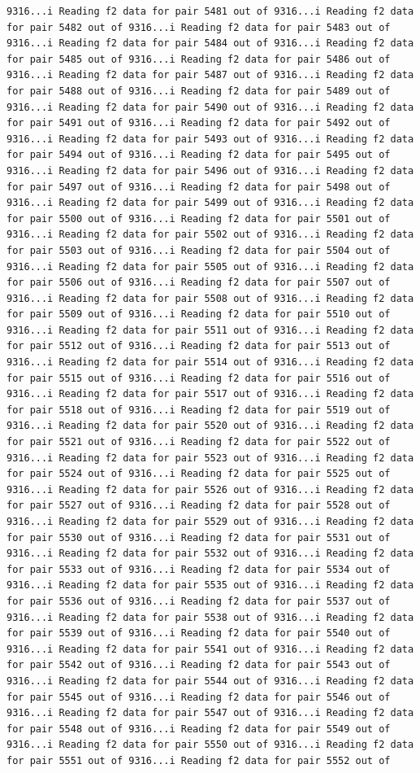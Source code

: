 \documentclass[
]{article}
\begin{document}
\begin{verbatim}
9316...i Reading f2 data for pair 5481 out of 9316...i Reading f2 data for pair 5482 out of 9316...i Reading f2 data for pair 5483 out of 9316...i Reading f2 data for pair 5484 out of 9316...i Reading f2 data for pair 5485 out of 9316...i Reading f2 data for pair 5486 out of 9316...i Reading f2 data for pair 5487 out of 9316...i Reading f2 data for pair 5488 out of 9316...i Reading f2 data for pair 5489 out of 9316...i Reading f2 data for pair 5490 out of 9316...i Reading f2 data for pair 5491 out of 9316...i Reading f2 data for pair 5492 out of 9316...i Reading f2 data for pair 5493 out of 9316...i Reading f2 data for pair 5494 out of 9316...i Reading f2 data for pair 5495 out of 9316...i Reading f2 data for pair 5496 out of 9316...i Reading f2 data for pair 5497 out of 9316...i Reading f2 data for pair 5498 out of 9316...i Reading f2 data for pair 5499 out of 9316...i Reading f2 data for pair 5500 out of 9316...i Reading f2 data for pair 5501 out of 9316...i Reading f2 data for pair 5502 out of 9316...i Reading f2 data for pair 5503 out of 9316...i Reading f2 data for pair 5504 out of 9316...i Reading f2 data for pair 5505 out of 9316...i Reading f2 data for pair 5506 out of 9316...i Reading f2 data for pair 5507 out of 9316...i Reading f2 data for pair 5508 out of 9316...i Reading f2 data for pair 5509 out of 9316...i Reading f2 data for pair 5510 out of 9316...i Reading f2 data for pair 5511 out of 9316...i Reading f2 data for pair 5512 out of 9316...i Reading f2 data for pair 5513 out of 9316...i Reading f2 data for pair 5514 out of 9316...i Reading f2 data for pair 5515 out of 9316...i Reading f2 data for pair 5516 out of 9316...i Reading f2 data for pair 5517 out of 9316...i Reading f2 data for pair 5518 out of 9316...i Reading f2 data for pair 5519 out of 9316...i Reading f2 data for pair 5520 out of 9316...i Reading f2 data for pair 5521 out of 9316...i Reading f2 data for pair 5522 out of 9316...i Reading f2 data for pair 5523 out of 9316...i Reading f2 data for pair 5524 out of 9316...i Reading f2 data for pair 5525 out of 9316...i Reading f2 data for pair 5526 out of 9316...i Reading f2 data for pair 5527 out of 9316...i Reading f2 data for pair 5528 out of 9316...i Reading f2 data for pair 5529 out of 9316...i Reading f2 data for pair 5530 out of 9316...i Reading f2 data for pair 5531 out of 9316...i Reading f2 data for pair 5532 out of 9316...i Reading f2 data for pair 5533 out of 9316...i Reading f2 data for pair 5534 out of 9316...i Reading f2 data for pair 5535 out of 9316...i Reading f2 data for pair 5536 out of 9316...i Reading f2 data for pair 5537 out of 9316...i Reading f2 data for pair 5538 out of 9316...i Reading f2 data for pair 5539 out of 9316...i Reading f2 data for pair 5540 out of 9316...i Reading f2 data for pair 5541 out of 9316...i Reading f2 data for pair 5542 out of 9316...i Reading f2 data for pair 5543 out of 9316...i Reading f2 data for pair 5544 out of 9316...i Reading f2 data for pair 5545 out of 9316...i Reading f2 data for pair 5546 out of 9316...i Reading f2 data for pair 5547 out of 9316...i Reading f2 data for pair 5548 out of 9316...i Reading f2 data for pair 5549 out of 9316...i Reading f2 data for pair 5550 out of 9316...i Reading f2 data for pair 5551 out of 9316...i Reading f2 data for pair 5552 out of 
\end{verbatim}
\end{document}
